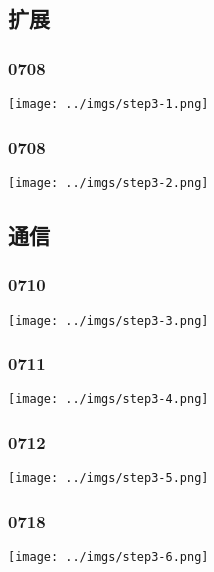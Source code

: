 \documentclass[UTF8,8pt,xcolor=dvipsnames]{beamer}
\begin{document}
\subsection{扩展}

\begin{frame}[fragile]
    \frametitle{0708}
    \begin{center}
        \texttt{[image: ../imgs/step3-1.png]}
    \end{center}
\end{frame}

\begin{frame}[fragile]
    \frametitle{0708}
    \begin{center}
        \texttt{[image: ../imgs/step3-2.png]}
    \end{center}
\end{frame}

\subsection{通信}

\begin{frame}[fragile]
    \frametitle{0710}
    \begin{center}
        \texttt{[image: ../imgs/step3-3.png]}
    \end{center}
\end{frame}

\begin{frame}[fragile]
    \frametitle{0711}
    \begin{center}
        \texttt{[image: ../imgs/step3-4.png]}
    \end{center}
\end{frame}

\begin{frame}[fragile]
    \frametitle{0712}
    \begin{center}
        \texttt{[image: ../imgs/step3-5.png]}
    \end{center}
\end{frame}

\begin{frame}[fragile]
    \frametitle{0718}
    \begin{center}
        \texttt{[image: ../imgs/step3-6.png]}
    \end{center}
\end{frame}
\end{document}
